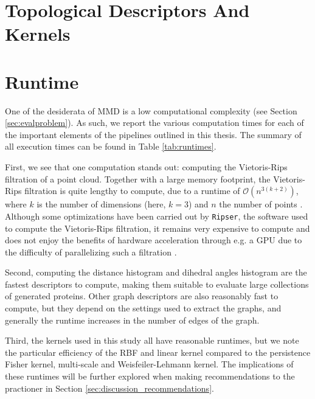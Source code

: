 \section{Topological Descriptors And Kernels}\label{sec:results_topo_kernels}

\section{Runtime}\label{sec:results_runtime}

One of the desiderata of MMD is a low computational complexity (see Section
\ref{sec:evalproblem}). As such, we report the various computation times for
each of the important elements of the pipelines outlined in this thesis. The
summary of all execution times can be found in Table \ref{tab:runtimes}.

First, we see that one computation stands out: computing the Vietoris-Rips
filtration of a point cloud. Together with a large memory footprint, the
Vietoris-Rips filtration is quite lengthy to compute, due to a runtime of
$\mathcal{O}(n^{3(k+2)})$, where $k$ is the number of dimensions (here, $k=3$)
and $n$ the number of points \citep{adams2018persistent}. Although some optimizations have been carried out
by \texttt{Ripser}, the software used to compute the Vietoris-Rips filtration,
it remains very expensive to compute and does not enjoy the benefits of hardware
acceleration through e.g. a GPU due to the difficulty of parallelizing such a
filtration \cite{Bauer2021Ripser}.

Second, computing the distance histogram and dihedral angles histogram are the
fastest descriptors to compute, making them suitable to evaluate large
collections of generated proteins. Other graph descriptors are also reasonably
fast to compute, but they depend on the settings used to extract the graphs, and
generally the runtime increases in the number of edges of the graph.

Third, the kernels used in this study all have reasonable runtimes, but we note
the particular efficiency of the RBF and linear kernel compared to the
persistence Fisher kernel, multi-scale and Weisfeiler-Lehmann kernel. The
implications of these runtimes will be further explored when making
recommendations to the practioner in Section
\ref{sec:discussion_recommendations}.


